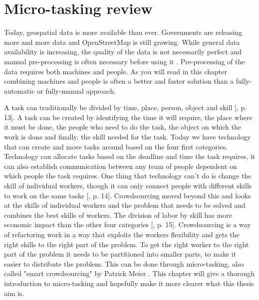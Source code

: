 \chapter{Micro-tasking review}
Today, geospatial data is more available than ever. Governments are releasing more and more data and OpenStreetMap is still growing. While general data availability is increasing, the quality of the data is not necessarily perfect and manual pre-processing is often necessary before using it \citep{Difallah2015}.  Pre-processing of the data requires both machines and people. As you will read in this chapter combining machines and people is often a better and faster solution than a fully-automatic or fully-manual approach. 

A task can traditionally be divided by time, place, person, object and skill [\citep{Meier2013}, p. 13]. A task can be created by identifying the time it will require, the place where it must be done, the people who need to do the task, the object on which the work is done and finally, the skill needed for the task. Today we have technology that can create and move tasks around based on the four first categories.  Technology can allocate tasks based on the deadline and time the task requires, it can also establish communication between any team of people dependent on which people the task requires. One thing that technology can't do is change the skill of individual workers, though it can only connect people with different skills to work on the same tasks [\citep{Meier2013}, p. 14]. Crowdsourcing moved beyond this and looks at the skills of individual workers and the problem that needs to be solved and combines the best skills of workers. The division of labor by skill has more economic impact than the other four categories [\citep{Meier2013}, p. 15]. Crowdsourcing is a way of refactoring work in a way that exploits the workers flexibility and gets the right skills to the right part of the problem. To get the right worker to the right part of the problem it needs to be partitioned into smaller parts, to make it easier to distribute the problem. This can be done through micro-tasking, also called "smart crowdsourcing" by Patrick Meier \citep{Meier2013a}. This chapter will give a thorough introduction to micro-tasking and hopefully make it more clearer what this thesis aim is. 

